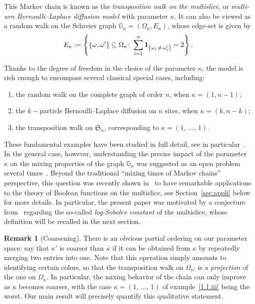 \documentclass[10pt]{amsart}
\theoremstyle{definition}\newtheorem{defi}[theo]{Definition}\newtheorem{rema}[theo]{Remark}\newtheorem{exam}[theo]{Example}\newtheorem{exem}[theo]{Example}\newtheorem{nota}[theo]{Notation}
\newcommand{\GG}{\mathbb{G}}
\newcommand{\frkS}{\mathfrak{S}}
\newcommand{\bfun}{\bf 1}
\newcommand*{\romanenumi}{\renewcommand*{\theenumi}{\roman{enumi}}}
\begin{document}
This Markov chain is known as the \emph{transposition walk on the multislice}, or \emph{multi-urn Bernoulli--Laplace diffusion model} with parameter $\kappa$. It can also be viewed as a random walk on the Schreier graph $\GG_\kappa=(\Omega_\kappa,E_\kappa)$, whose edge-set is given by
\[
E_\kappa := \left\{\left\{\omega,\omega'\right\}\subseteq \Omega_\kappa\colon \sum_{i=1}^n{\bfun}_{\left(\omega_i\,\ne\,\omega_i'\right)}=2\right\}.
\]

Thanks to the degree of freedom in the choice of the parameter $\kappa$, the model is rich enough to encompass several classical special cases, including:
\begin{enumerate}\romanenumi
\item \label{1.1.i} the random walk on the complete graph of order $n$, when $\kappa=(1,n-1)$;
\item \label{1.1.ii}the $k-$particle Bernoulli--Laplace diffusion on $n$ sites, when $\kappa=(k,n-k)$;
\item \label{1.1.iii}the transposition walk on $\frkS_n$, corresponding to $\kappa=(1,\,\ldots,\,1)$.
\end{enumerate}

These fundamental examples have been studied in full detail, see in particular~\cite{MR2240787,MR626813,MR871832,MR2094147,
MR2869447,MR1675008,MR958246,MR1436486,MR2166362,2019arXiv190508514T}. In the general case, however, understanding the precise impact of the parameter $\kappa$ on the mixing properties of the graph $\GG_\kappa$ was suggested as an open problem several times~\cite{MR964069,MR871832,MR3990024}. Beyond the traditional ``mixing times of Markov chains'' perspective, this question was recently shown in~\cite{MR3990024,MR4079633,2018arXiv180903546F} to have remarkable applications to the theory of Boolean functions on the multislice, see Section~\ref{sec:appli} below for more details. In particular, the present paper was motivated by a conjecture from~\cite{2018arXiv180903546F} regarding the so-called \emph{log-Sobolev constant} of the multislice, whose definition will be recalled in the next section.

\begin{rema}[Coarsening]\label{rk:coarsening}
There is an obvious partial ordering on our parameter space: say that $\kappa'$ is coarser than $\kappa$ if it can be obtained from $\kappa$ by repeatedly merging two entries into one. Note that this operation simply amounts to identifying certain colors, so that the transposition walk on $\Omega_{\kappa'}$ is a \emph{projection} of the one on $\Omega_{\kappa}$. In particular, the mixing behavior of the chain can only improve as $\kappa$ becomes coarser, with the case $\kappa=(1,\,\ldots,\,1)$ of example~\eqref{1.1.iii} being the worst. Our main result will precisely quantify this qualitative statement.
\end{rema}
\end{document}
